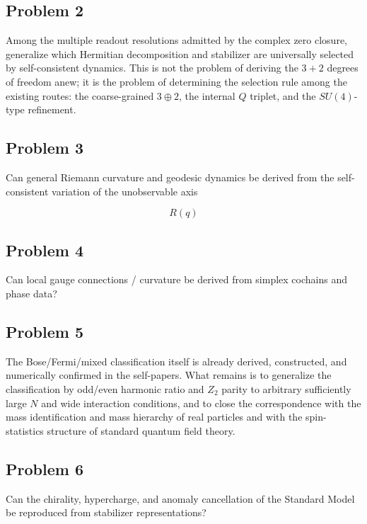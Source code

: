 \documentclass[
  a4paper,
]{article}
\begin{document}
\subsection{Problem 2}\label{problem-2}

Among the multiple readout resolutions admitted by the complex zero
closure, generalize which Hermitian decomposition and stabilizer are
universally selected by self-consistent dynamics. This is not the
problem of deriving the \(3+2\) degrees of freedom anew; it is the
problem of determining the selection rule among the existing routes: the
coarse-grained \(3\oplus2\), the internal \(Q\) triplet, and the
\(SU(4)\)-type refinement.

\subsection{Problem 3}\label{problem-3}

Can general Riemann curvature and geodesic dynamics be derived from the
self-consistent variation of the unobservable axis

\[
R(q)
\]

\subsection{Problem 4}\label{problem-4}

Can local gauge connections / curvature be derived from simplex cochains
and phase data?

\subsection{Problem 5}\label{problem-5}

The Bose/Fermi/mixed classification itself is already derived,
constructed, and numerically confirmed in the self-papers. What remains
is to generalize the classification by odd/even harmonic ratio and
\(Z_2\) parity to arbitrary sufficiently large \(N\) and wide
interaction conditions, and to close the correspondence with the mass
identification and mass hierarchy of real particles and with the
spin-statistics structure of standard quantum field theory.

\subsection{Problem 6}\label{problem-6}

Can the chirality, hypercharge, and anomaly cancellation of the Standard
Model be reproduced from stabilizer representations?
\end{document}
